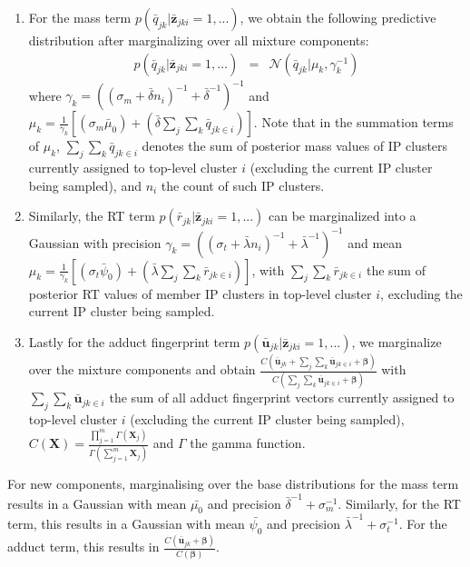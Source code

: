 \begin{enumerate}
\item For the mass term $p({\bar{q}}_{jk}\vert\boldsymbol{\bar{z}}_{jki}=1,...)$, we obtain the following predictive distribution after marginalizing over all mixture components: \begin{eqnarray} p({\bar{q}}_{jk}\vert\boldsymbol{\bar{z}}_{jki}=1,...) & = & \mathcal{N}({\bar{q}}_{jk}|\mu_{k},\gamma_{k}^{-1})\label{eq:15-2} \end{eqnarray} where $\gamma_{k}=((\sigma_{m}+\bar{\delta}n_{i})^{-1}+\bar{\delta}^{-1})^{-1}$ and $\mu_{k}=\frac{1}{\gamma_{k}}\left[(\sigma_{m}\bar{\mu}_{0})+(\bar{\delta}\sum_{j}\sum_{k}\bar{q}_{jk\in i})\right]$. Note that in the summation terms of $\mu_{k}$, $\sum_{j}\sum_{k}\bar{q}_{jk\in i}$ denotes the sum of posterior mass values of IP clusters currently assigned to top-level cluster $i$ (excluding the current IP cluster being sampled), and $n_{i}$ the count of such IP clusters. 
\item Similarly, the RT term $p({\bar{r}}_{jk}\vert\boldsymbol{\bar{z}}_{jki}=1,...)$ can be marginalized into a Gaussian with precision $\gamma_{k}=((\sigma_{t}+\bar{\lambda}n_{i})^{-1}+\bar{\lambda}^{-1})^{-1}$ and mean $\mu_{k}=\frac{1}{\gamma_{k}}\left[(\sigma_{t}\bar{\psi}_{0})+(\bar{\lambda}\sum_{j}\sum_{k}\bar{r}_{jk\in i})\right]$, with $\sum_{j}\sum_{k}\bar{r}_{jk\in i}$ the sum of posterior RT values of member IP clusters in top-level cluster $i$, excluding the current IP cluster being sampled.
\item Lastly for the adduct fingerprint term $p({\boldsymbol{\bar{u}}}_{jk}\vert\boldsymbol{\bar{z}}_{jki}=1,...)$, we marginalize over the mixture components and obtain $\frac{C\left({\boldsymbol{\bar{u}}}_{jk}+\sum_{j}\sum_{k}\boldsymbol{\bar{u}}_{jk\in i}+\boldsymbol{\beta}\right)}{C\left(\sum_{j}\sum_{k}\boldsymbol{\bar{u}}_{jk\in i}+\boldsymbol{\beta}\right)}$ with $\sum_{j}\sum_{k}\boldsymbol{\bar{u}}_{jk\in i}$ the sum of all adduct fingerprint vectors currently assigned to top-level cluster $i$ (excluding the current IP cluster being sampled), $C(\boldsymbol{X})=\frac{\prod_{j=1}^{m}\Gamma(\boldsymbol{X}_{j})}{\Gamma(\sum_{j=1}^{m}\boldsymbol{X}_{j})}$ and $\Gamma$ the gamma function.
\end{enumerate}
For new components, marginalising over the base distributions for the mass term results in a Gaussian with mean $\bar{\mu_{0}}$ and precision $\bar{\delta}^{-1}+\sigma_{m}^{-1}$. Similarly, for the RT term, this results in a Gaussian with mean $\bar{\psi_{0}}$ and precision $\bar{\lambda}^{-1}+\sigma_{t}^{-1}$. For the adduct term, this results in $\frac{C\left({\boldsymbol{\bar{u}}}_{jk}+\boldsymbol{\beta}\right)}{C\left(\boldsymbol{\beta}\right)}$.


